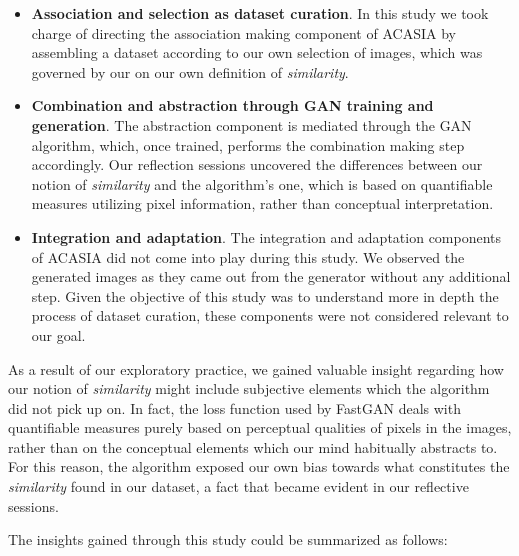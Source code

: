 \begin{itemize}
\item \textbf{Association and selection as dataset curation}. In this study we took charge of directing the association making component of ACASIA by assembling a dataset according to our own selection of images, which was governed by our on our own definition of \emph{similarity}.
\item \textbf{Combination and abstraction through GAN training and generation}. The abstraction component is mediated through the GAN algorithm, which, once trained, performs the combination making step accordingly. Our reflection sessions uncovered the differences between our notion of \emph{similarity} and the algorithm's one, which is based on quantifiable measures utilizing pixel information, rather than conceptual interpretation.
\item \textbf{Integration and adaptation}. The integration and adaptation components of ACASIA did not come into play during this study. We observed the generated images as they came out from the generator without any additional step. Given the objective of this study was to understand more in depth the process of dataset curation, these components were not considered relevant to our goal.
\end{itemize}

As a result of our exploratory practice, we gained valuable insight regarding how our notion of \emph{similarity} might include subjective elements which the algorithm did not pick up on. In fact, the loss function used by FastGAN deals with quantifiable measures purely based on perceptual qualities of pixels in the images, rather than on the conceptual elements which our mind habitually abstracts to. For this reason, the algorithm exposed our own bias towards what constitutes the \emph{similarity} found in our dataset, a fact that became evident in our reflective sessions.

The insights gained through this study could be summarized as follows:

